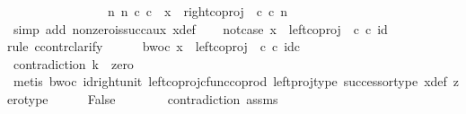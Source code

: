 \begin{isabellebody}
\ \ \ \ \ \ \ \ \ \ \ \ \ \ \ \ {\isacharparenleft}{\kern0pt}{\isasymexists}n{\isachardot}{\kern0pt}\ {\isacharparenleft}{\kern0pt}n\ {\isasymin}\isactrlsub c\ {\isasymnat}\isactrlsub c\ {\isasymand}\ x\ {\isacharequal}{\kern0pt}\ {\isacharparenleft}{\kern0pt}right{\isacharunderscore}{\kern0pt}coproj\ {\isasymone}\ {\isasymnat}\isactrlsub c{\isacharparenright}{\kern0pt}\ {\isasymcirc}\isactrlsub c\ n{\isacharparenright}{\kern0pt}{\isacharparenright}{\kern0pt}{\isachardoublequoteclose}\isanewline
\ \ \ \ \isamarkupfalse%
\ {\isacharparenleft}{\kern0pt}simp\ add{\isacharcolon}{\kern0pt}\ nonzero{\isacharunderscore}{\kern0pt}is{\isacharunderscore}{\kern0pt}succ{\isacharunderscore}{\kern0pt}aux\ x{\isacharunderscore}{\kern0pt}def{\isacharparenright}{\kern0pt}\isanewline
\ \ \isamarkupfalse%
\ not{\isacharunderscore}{\kern0pt}case{\isacharunderscore}{\kern0pt}{}{\isacharcolon}{\kern0pt}\ {\isachardoublequoteopen}x\ {\isasymnoteq}\ {\isacharparenleft}{\kern0pt}left{\isacharunderscore}{\kern0pt}coproj\ {\isasymone}\ {\isasymnat}\isactrlsub c{\isacharparenright}{\kern0pt}\ {\isasymcirc}\isactrlsub c\ id\ {\isasymone}{\isachardoublequoteclose}\isanewline
\ \ \isamarkupfalse%
{\isacharparenleft}{\kern0pt}rule\ ccontr{\isacharcomma}{\kern0pt}clarify{\isacharparenright}{\kern0pt}\isanewline
\ \ \ \ \isamarkupfalse%
\ bwoc{\isacharcolon}{\kern0pt}\ {\isachardoublequoteopen}x\ {\isacharequal}{\kern0pt}\ left{\isacharunderscore}{\kern0pt}coproj\ {\isasymone}\ {\isasymnat}\isactrlsub c\ {\isasymcirc}\isactrlsub c\ id\isactrlsub c\ {\isasymone}{\isachardoublequoteclose}\isanewline
\ \ \ \ \isamarkupfalse%
\ contradiction{\isacharcolon}{\kern0pt}\ {\isachardoublequoteopen}k\ {\isacharequal}{\kern0pt}\ zero{\isachardoublequoteclose}\isanewline
\ \ \ \ \ \ \isamarkupfalse%
\ {\isacharparenleft}{\kern0pt}metis\ bwoc\ id{\isacharunderscore}{\kern0pt}right{\isacharunderscore}{\kern0pt}unit{}\ left{\isacharunderscore}{\kern0pt}coproj{\isacharunderscore}{\kern0pt}cfunc{\isacharunderscore}{\kern0pt}coprod\ left{\isacharunderscore}{\kern0pt}proj{\isacharunderscore}{\kern0pt}type\ successor{\isacharunderscore}{\kern0pt}type\ x{\isacharunderscore}{\kern0pt}def\ zero{\isacharunderscore}{\kern0pt}type{\isacharparenright}{\kern0pt}\isanewline
\ \ \ \ \isamarkupfalse%
\ False\isanewline
\ \ \ \ \ \ \isamarkupfalse%
\ contradiction\ assms{\isacharparenleft}{\kern0pt}{}{\isacharparenright}{\kern0pt}\ \isamarkupfalse%

\end{isabellebody}
